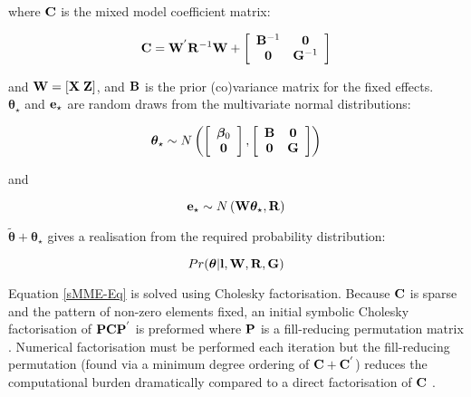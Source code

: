 \documentclass{article}
\begin{document}
where ${\bf C}$ is the mixed model coefficient matrix:

\begin{equation}
{\bf C} = {\bf W}^{'}{\bf R}^{-1}{\bf W}+
\left[
\begin{array}{c c}
{\bf B}^{-1}&{\bf 0}\\
{\bf 0}&{\bf G}^{-1}\\
\end{array}
\right]
\end{equation}

and ${\bf W} = \left[{\bf X}\; {\bf Z}\right]$, and ${\bf B}$ is the prior (co)variance matrix for the fixed effects.\\

${\bm \theta}_{\star}$ and ${\bf e}_{\star}$ are random draws from the multivariate normal distributions:

\begin{equation}
{\bm \theta}_{\star} \sim N\left(
\left[
\begin{array}{c}
{\bm \beta_{0}}\\
{\bf 0}\\
\end{array}
\right]
,
\left[
\begin{array}{c c}
{\bf B}&{\bf 0}\\
{\bf 0}&{\bf G}\\
\end{array}
\right]
\right)
\end{equation}

and 

\begin{equation}
{\bf e}_{\star} \sim N\left({\bf W}{\bm \theta}_{\star},{\bf R}\right)
\end{equation}

$\tilde{\bm  \theta} + {\bm \theta}_{\star}$ gives a realisation from the required probability distribution:

\begin{equation}
Pr({\bm \theta} | {\bf l}, {\bf W}, {\bf R}, {\bf G})
\end{equation}

Equation \ref{sMME-Eq} is solved using Cholesky factorisation. Because ${\bf C}$ is sparse and the pattern of non-zero elements fixed, an initial symbolic Cholesky factorisation of ${\bf P}{\bf C}{\bf P}^{'}$ is preformed where ${\bf P}$ is a fill-reducing permutation matrix  \citep{Davis.2006}. Numerical factorisation must be performed each iteration but the fill-reducing permutation (found via a minimum degree ordering of ${\bf C}+{\bf C}^{'}$) reduces the computational burden dramatically compared to a direct factorisation of ${\bf C}$  \citep{Davis.2006}.\\
\end{document}
